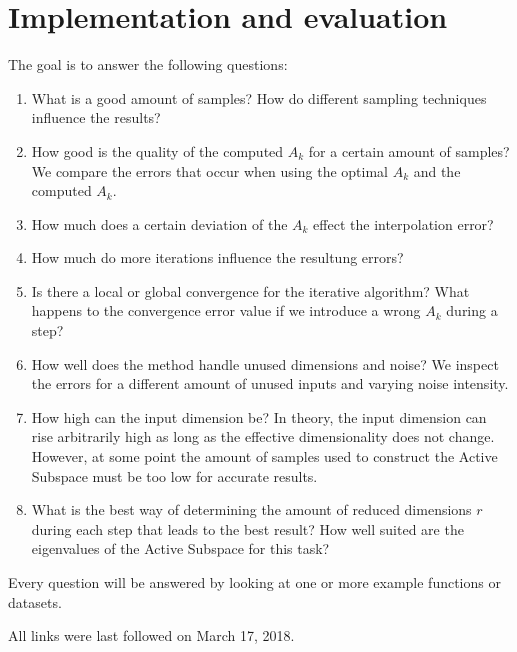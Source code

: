 \documentclass[
  a4paper,  %
  twoside,  %
  bibliography=totoc,
  headsepline,
  cleardoublepage=empty,
  parskip=half,
  draft=false
]{scrbook}
\begin{document}
\chapter{Implementation and evaluation}

The goal is to answer the following questions:

\begin{enumerate}
\item What is a good amount of samples? How do different sampling techniques influence the results?

\item How good is the quality of the computed $A_k$ for a certain amount of samples? We compare the errors that occur when using the optimal $A_k$ and the computed $A_k$.

\item How much does a certain deviation of the $A_k$ effect the interpolation error?

\item How much do more iterations influence the resultung errors?

\item Is there a local or global convergence for the iterative algorithm? What happens to the convergence error value if we introduce a wrong $A_k$ during a step?

\item How well does the method handle unused dimensions and noise? We inspect the errors for a different amount of unused inputs and varying noise intensity.

\item How high can the input dimension be? In theory, the input dimension can rise arbitrarily high as long as the effective dimensionality does not change. However, at some point the amount of samples used to construct the Active Subspace must be too low for accurate results.

\item What is the best way of determining the amount of reduced dimensions $r$ during each step that leads to the best result? How well suited are the eigenvalues of the Active Subspace for this task?
\end{enumerate}

Every question will be answered by looking at one or more example functions or datasets.

\printbibliography

All links were last followed on March 17, 2018.

\appendix

\pagestyle{empty}
\renewcommand*{\chapterpagestyle}{empty}
\Versicherung
\end{document}
